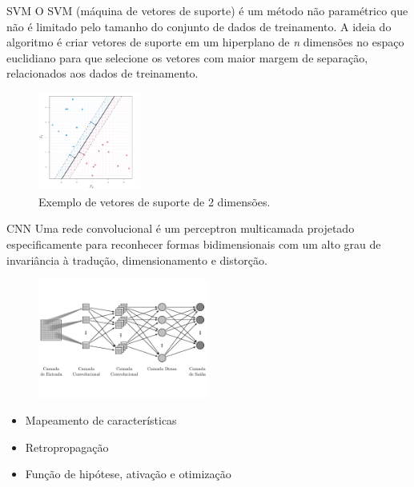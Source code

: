 \documentclass{apresentacao-ifb}
\begin{document}
\begin{frame}{SVM}
    O SVM (máquina de vetores de suporte) é um método não paramétrico que não é limitado pelo tamanho do conjunto de dados de treinamento. A ideia do algoritmo é criar vetores de suporte em um hiperplano de \textit{n} dimensões no espaço euclidiano para que selecione os vetores com maior margem de separação, relacionados aos dados de treinamento.

    \begin{figure}[h]
    \centering
    \includegraphics[width=0.3\textwidth]{svm.png}
    \caption{Exemplo de vetores de suporte de 2 dimensões.}
    \label{fig:svm_1}
\end{figure}

\end{frame}

\begin{frame}{CNN}
    Uma rede convolucional é um perceptron multicamada projetado especificamente para reconhecer formas bidimensionais com um alto grau de invariância à tradução, dimensionamento e distorção.

    \begin{figure}[h]
    \centering
    \includegraphics[width=0.5\textwidth]{cnn.png}
    \label{fig:cnn}
    \end{figure}
    
    \begin{itemize}
        \item Mapeamento de características
        \item Retropropagação
        \item Função de hipótese, ativação e otimização
    \end{itemize}
    
\end{frame}
\end{document}
